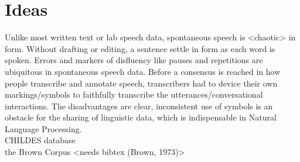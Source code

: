 \chapter{Ideas} %

\label{Chapter7} %

Unlike most written text or lab speech data, spontaneous speech is <chaotic> in form. Without drafting or editing, a sentence settle in form as each word is spoken. Errors and markers of disfluency like pauses and repetitions are ubiquitous in spontaneous speech data. Before a consensus is reached in how people transcribe and annotate speech, transcribers had to device their own markings/symbols to faithfully transcribe the utterances/conversational interactions. The disadvantages are clear, inconsistent use of symbols is an obstacle for the sharing of linguistic data, which is indispensable in Natural Language Processing.\\

CHILDES database \cite{Macwhinney2000}\\
the Brown Corpus <needs bibtex (Brown, 1973)>\\
